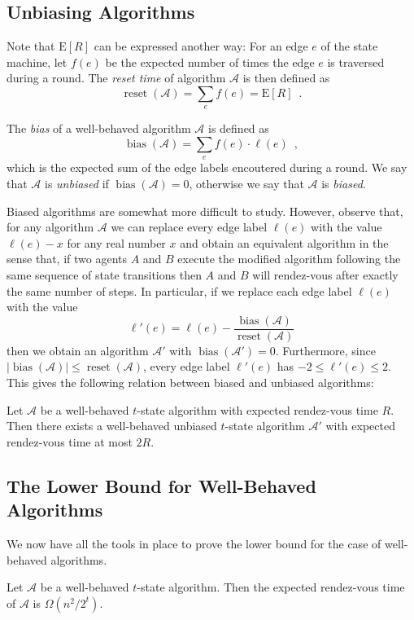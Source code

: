 \documentclass[lotsofwhite]{patmorin}
\newcommand{\E}{\mathrm{E}}
\newcommand{\A}{\mathcal{A}}
\DeclareMathOperator{\bias}{bias}
\DeclareMathOperator{\reset}{reset}
\begin{document}
\subsection{Unbiasing Algorithms}

Note that $\E[R]$ can be expressed another way: For an edge $e$ of the
state machine, let $f(e)$ be the expected number of times the edge $e$
is traversed during a round.  The
\emph{reset time} of algorithm $\A$ is then defined as
\[
   \reset(\A) = \sum_e f(e) = \E[R] \enspace .
\]

The \emph{bias} of a well-behaved algorithm $\A$ is defined as
\[
    \bias(\A) = \sum_{e} f(e)\cdot\ell(e) \enspace ,
\]
which is the expected sum of the edge labels encoutered during a round.
We say that $\A$ is \emph{unbiased} if $\bias(\A)=0$, otherwise we say
that $\A$ is \emph{biased}.

Biased algorithms are somewhat more difficult to study.  However,
observe that, for any algorithm $\mathcal{A}$ we can replace every
edge label $\ell(e)$ with the value $\ell(e)-x$ for any real number
$x$ and obtain an equivalent algorithm in the sense that, if two
agents $A$ and $B$ execute the modified algorithm following the same
sequence of state transitions then $A$ and $B$ will rendez-vous after
exactly the same number of steps.  In particular, if we replace each
edge label $\ell(e)$ with the value
\[
   \ell'(e) = \ell(e) - \frac{\bias(\A)}{\reset(\A)}
\]
then we obtain an algorithm $\A'$ with $\bias(\A')=0$.  Furthermore, since
$|\bias(\A)|\le\reset(\A)$, every edge label $\ell'(e)$ has
$-2 \le \ell'(e)\le 2$.  This gives the following relation between
biased and unbiased algorithms:

\begin{lem}
Let $\A$ be a well-behaved $t$-state algorithm with expected rendez-vous time
$R$.  Then there exists a well-behaved unbiased $t$-state algorithm $\A'$ with
expected rendez-vous time at most $2R$.
\end{lem}

\subsection{The Lower Bound for Well-Behaved Algorithms}

We now have all the tools in place to prove the lower bound for the
case of well-behaved algorithms.

\begin{lem}
Let $\A$ be a well-behaved $t$-state algorithm.  Then the expected rendez-vous
time of $\A$ is $\Omega(n^2/2^{t})$.
\end{lem}
\end{document}
